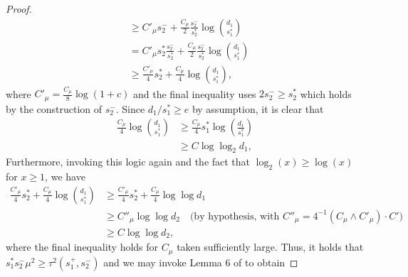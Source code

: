 \documentclass{article}
\theoremstyle{remark}
\begin{document}
\begin{proof}
\begin{align*}
    &\geq C'_\mu s_2^- + \frac{C_\mu}{2}\frac{s_2^-}{s_2^*}\log {d_1 \choose s_1^*} \\
    &= C'_\mu s_2^*\frac{s_2^-}{s_2^*} + \frac{C_\mu}{2}\frac{s_2^-}{s_2^*}\log {d_1 \choose s_1^*} \\
    &\geq \frac{C'_{\mu}}{4}s_2^* + \frac{C_\mu}{4}\log {d_1 \choose s_1^*},
\end{align*}
where $C'_\mu = \frac{C_\mu}{8}\log(1 + c)$ and the final inequality uses $2s_2^- \geq s_2^*$ which holds by the construction of $s_2^-$. Since $d_1/s_1^* \geq e$ by assumption, it is clear that
\begin{align*}
    \frac{C_\mu}{4}\log {d_1 \choose s_1^*} &\geq \frac{C_\mu}{4} s_1^* \log\left(\frac{d_1}{s_1^*}\right) \\
    &\geq C \log \log_2 d_1,
\end{align*}
Furthermore, invoking this logic again and the fact that $\log_2(x) \geq \log (x)$ for $x \geq 1$, we have
\begin{align*}
    \frac{C'_{\mu}}{4}s_2^* + \frac{C_\mu}{4}\log {d_1 \choose s_1^*} &\geq \frac{C'_{\mu}}{4}s_2^* + \frac{C_\mu}{4} \log \log d_1 \\
    &\geq C''_\mu \log \log d_2 \quad \text{(by hypothesis, with $C''_\mu = 4^{-1}(C_\mu \land C'_\mu) \cdot C'$)} \\
    &\geq C \log \log d_2,
\end{align*}
where the final inequality holds for $C_\mu$ taken sufficiently large. Thus, it holds that $s_1^* s_2^- \mu^2 \geq \tau^2(s_1^+, s_2^-)$ and we may invoke Lemma 6 of \cite{liu2021minimax} to obtain

\end{proof}
\end{document}
